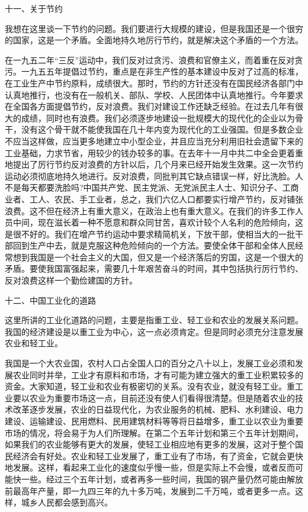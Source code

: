 \documentclass[UTF8, 12pt, a4paper]{ctexrep}
\begin{document}
十一、关于节约

我想在这里谈一下节约的问题。我们要进行大规模的建设，但是我国还是一个很穷的国家，这是一个矛盾。全面地持久地厉行节约，就是解决这个矛盾的一个方法。

在一九五二年“三反”运动中，我们反对过贪污、浪费和官僚主义，而着重在反对贪污。一九五五年提倡过节约，重点是在非生产性的基本建设中反对了过高的标准，在工业生产中节约原料，成绩很大。那时，节约的方针还没有在国民经济各部门中认真地推行，也没有在一般机关、部队、学校、人民团体中认真地推行。今年要求在全国各方面提倡节约，反对浪费。我们对建设工作还缺乏经验。在过去几年有很大的成绩，同时也有浪费。我们必须逐步地建设一批规模大的现代化的企业以为骨干，没有这个骨干就不能使我国在几十年内变为现代化的工业强国。但是多数企业不应当这样做，应当更多地建立中小型企业，并且应当充分利用旧社会遗留下来的工业基础，力求节省，用较少的钱办较多的事。在去年十一月中共二中全会更着重地提出了厉行节约反对浪费的方针以后，几个月来已经开始发生效果。这一次节约运动必须彻底地持久地进行。反对浪费，同批判其它缺点错误一样，好比洗脸。人不是每天都要洗脸吗?中国共产党、民主党派、无党派民主人士、知识分子、工商业者、工人、农民、手工业者，总之，我们六亿人口都要实行增产节约，反对铺张浪费。这不但在经济上有重大意义，在政治上也有重大意义。在我们的许多工作人员中间，现在滋长着一种不愿意和群众同甘苦，喜欢计较个人名利的危险倾向，这是很不好的。我们在增产节约运动中要求精简机关，下放干部，使相当大的一批干部回到生产中去，就是克服这种危险倾向的一个方法。要使全体干部和全体人民经常想到我国是一个社会主义的大国，但又是一个经济落后的穷国，这是一个很大的矛盾。要使我国富强起来，需要几十年艰苦奋斗的时间，其中包括执行厉行节约、反对浪费这样一个勤俭建国的方针。

十二、中国工业化的道路

这里所讲的工业化道路的问题，主要是指重工业、轻工业和农业的发展关系问题。我国的经济建设是以重工业为中心，这一点必须肯定。但是同时必须充分注意发展农业和轻工业。

我国是一个大农业国，农村人口占全国人口的百分之八十以上，发展工业必须和发展农业同时并举，工业才有原料和市场，才有可能为建立强大的重工业积累较多的资金。大家知道，轻工业和农业有极密切的关系。没有农业，就没有轻工业。重工业要以农业为重要市场这一点，目前还没有使人们看得很清楚。但是随着农业的技术改革逐步发展，农业的日益现代化，为农业服务的机械、肥料、水利建设、电力建设、运输建设、民用燃料、民用建筑材料等等将日益增多，重工业以农业为重要市场的情况，将会易于为人们所理解。在第二个五年计划和第三个五年计划期间，如果我们的农业能够有更大的发展，使轻工业相应地有更多的发展，这对于整个国民经济会有好处。农业和轻工业发展了，重工业有了市场，有了资金，它就会更快地发展。这样，看起来工业化的速度似乎慢一些，但是实际上不会慢，或者反而可能快一些。经过三个五年计划，或者再多一些时间，我国的钢产量仍然可能由解放前最高年产量，即一九四三年的九十多万吨，发展到二千万吨，或者更多一点。这样，城乡人民都会感到高兴。
\end{document}
